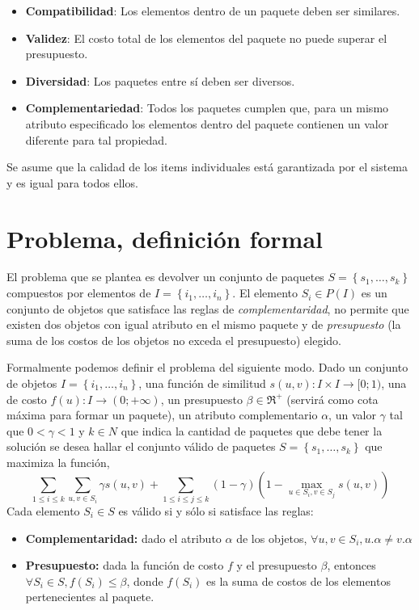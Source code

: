 \begin{itemize}
  \item \textbf{Compatibilidad}: Los elementos dentro de un paquete deben ser similares.
  \item \textbf{Validez}: El costo total de los elementos del paquete no puede superar el presupuesto.
  \item \textbf{Diversidad}: Los paquetes entre sí deben ser diversos.
  \item \textbf{Complementariedad}: Todos los paquetes cumplen que, para un mismo atributo especificado los elementos dentro del paquete contienen un valor diferente para tal propiedad.
\end{itemize}

Se asume que la calidad de los items individuales está garantizada por el sistema y es igual para todos ellos. 

\section{Problema, definición formal}
El problema que se plantea es devolver un conjunto de paquetes $S = \left\{s_1, \ldots, s_k\right\}$ compuestos por elementos de $I=\left\{i_1,\ldots, i_n\right\}$. El elemento $S_i \in P(I)$ es un conjunto de objetos que satisface las reglas de \textit{complementaridad}, no permite que existen dos objetos con igual atributo en el mismo paquete y de \textit{presupuesto} (la suma de los costos de los objetos no exceda el presupuesto) elegido.

Formalmente podemos definir el problema del siguiente modo. Dado un conjunto de objetos $I=\left\{i_1,\ldots, i_n\right\}$, una función de similitud $s(u,v): I \times I \rightarrow [0;1)$, una de costo $f(u): I \rightarrow (0;+\infty)$, un presupuesto $\beta \in \Re^{+}$ (servirá como cota máxima para formar un paquete), un atributo complementario $\alpha$, un valor $\gamma$ tal que $0 < \gamma < 1$ y $k \in N$ que indica la cantidad de paquetes que debe tener la solución se desea hallar el conjunto válido de paquetes $S = \left\{s_1, \ldots, s_k\right\}$ que maximiza la función,
\begin{equation} \label{des:eq-fnObj}
\sum_{1 \leq i \leq k}{\sum_{u,v \in S_i}{\gamma s(u,v)}} + \sum_{1 \leq i \leq j \leq k}{(1-\gamma) (1-\max_{u \in S_i, v \in S_j}{s(u,v)})}
\end{equation}
Cada elemento $S_i \in S$ es válido si y sólo si satisface las reglas:
\begin{itemize}
	\item \textbf{Complementaridad:} dado el atributo $\alpha$ de los objetos, $\forall u,v \in S_i, u.\alpha \neq v.\alpha$
	\item \textbf{Presupuesto:} dada la función de costo $f$ y el presupuesto $\beta$, entonces $\forall S_i \in S, f(S_i) \leq \beta$, donde $f(S_i)$ es la suma de costos de los elementos pertenecientes al paquete.
\end{itemize}		  

